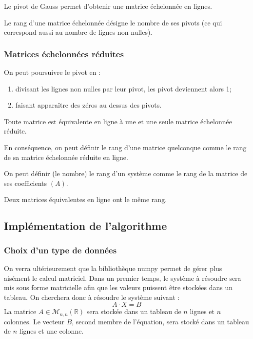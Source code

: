 \begin{proposition}
Le pivot de Gauss permet d'obtenir une matrice échelonnée en lignes. 
\end{proposition}

\begin{defi}{}
Le rang d'une matrice échelonnée désigne le nombre de ses pivots (ce qui correspond aussi au nombre de lignes non nulles). 
\end{defi}

\subsubsection{Matrices échelonnées réduites}
On peut poursuivre le pivot en : 
\begin{enumerate}
\item divisant les lignes non nulles par leur pivot, les pivot deviennent alors 1;
\item faisant apparaître des zéros au dessus des pivots. 
\end{enumerate}

\begin{proposition}
Toute matrice est équivalente en ligne à une et une seule matrice échelonnée réduite. 

En conséquence, on peut définir le rang d'une matrice quelconque comme le rang de sa matrice échelonnée réduite en ligne. 

On peut définir (le nombre) le rang d'un système comme le rang de la matrice de ses coefficients $(A)$. 
\end{proposition}

\begin{rem}
Deux matrices équivalentes en ligne ont le même rang. 
\end{rem}

\subsection{Implémentation de l'algorithme}

\subsubsection{Choix d'un type de données}
On verra ultérieurement que la bibliothèque numpy permet de gérer plus aisément le calcul matriciel. Dans un premier temps, le système à résoudre sera mis sous forme matricielle afin que les valeurs puissent être stockées dans un tableau. 
On cherchera donc à résoudre le système suivant :
$$
A\cdot X = B
$$
La matrice $A\in\mathcal{M}_{n,n}(\mathbb{R})$ sera stockée dans un tableau de $n$ lignes et $n$ colonnes. Le vecteur $B$, second membre de l'équation, sera stocké dans un tableau de $n$ lignes et une colonne. 


